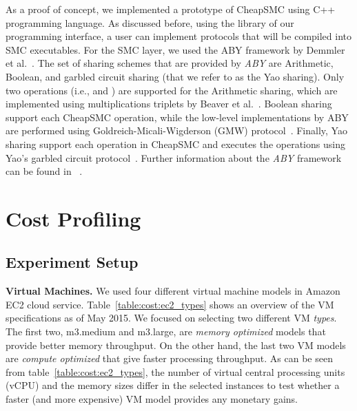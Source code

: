 \documentclass{llncs}
\newcommand{\sysname}{{CheapSMC}\xspace}
\begin{document}
As a proof of concept, we implemented a prototype of \sysname using C++ programming language. As discussed before, using the library of  our programming interface, a user can implement protocols that will be compiled into SMC executables. For the SMC layer, we used the ABY framework by Demmler et al.~\cite{cite:demmler2015aby}. The set of sharing schemes that are provided by \emph{ABY} are Arithmetic, Boolean, and garbled circuit sharing (that we refer to as the Yao sharing). Only two operations (i.e.,  and ) are supported for the Arithmetic sharing, which are implemented using multiplications triplets by Beaver et al.~\cite{cite:beaver1992efficient}. Boolean sharing support each \sysname operation, while the low-level implementations by ABY are performed using Goldreich-Micali-Wigderson (GMW) protocol~\cite{cite:goldwasser1987play}. Finally, Yao sharing support each operation in \sysname and executes the operations using Yao's garbled circuit protocol~\cite{cite:yao1982protocols}. Further information about the \emph{ABY} framework can be found in ~\cite{cite:demmler2015aby}.


\vspace{-0.5cm}
\section{Cost Profiling}
\label{sec:cost}

\subsection{Experiment Setup}
\label{sec:cost:setup}

\textbf{Virtual Machines.} We used four different virtual machine models in Amazon EC2 cloud service. Table~\ref{table:cost:ec2_types} shows an overview of the VM specifications as of May 2015. We focused on selecting two different VM \emph{types}. The first two, m3.medium and m3.large, are \emph{memory optimized} models that provide better memory throughput. On the other hand, the last two VM models are \emph{compute optimized} that give faster processing throughput. As can be seen from table~\ref{table:cost:ec2_types}, the number of virtual central processing units (vCPU) and the memory sizes differ in the selected instances to test whether a faster (and more expensive) VM model provides any monetary gains.
\end{document}
